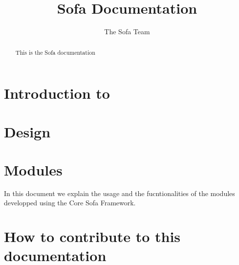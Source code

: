 \documentclass[a4paper,10pt]{report}
\title{Sofa Documentation}
\author{The Sofa Team}
\begin{document}
\maketitle

\begin{abstract}
This is the Sofa documentation
\end{abstract}

\tableofcontents

\chapter{Introduction to \sofa}
\graphicspath{{introduction/}}  %


\chapter{Design}
\graphicspath{{design/}}  %

\chapter{Modules}
\graphicspath{{modules/}}  %
In this document we explain the usage and the fucntionalities of the modules developped using the Core Sofa Framework.

\chapter{How to contribute to this documentation}
\end{document}
